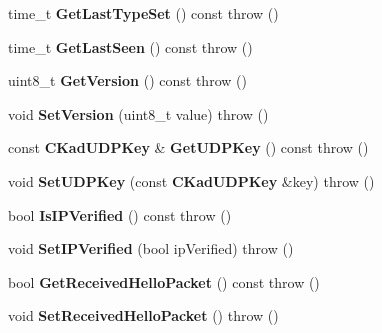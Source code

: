 \begin{DoxyCompactItemize}
\item 
time\_\-t {\bfseries GetLastTypeSet} () const   throw ()\label{classKademlia_1_1CContact_ad72c2ff3532316a48a8282dc014da35b}

\item 
time\_\-t {\bfseries GetLastSeen} () const   throw ()\label{classKademlia_1_1CContact_ac2820b261b028fe3bcac134ed10b3dc4}

\item 
uint8\_\-t {\bfseries GetVersion} () const   throw ()\label{classKademlia_1_1CContact_a2cee1cef932e993fcc8ca567614c7479}

\item 
void {\bfseries SetVersion} (uint8\_\-t value)  throw ()\label{classKademlia_1_1CContact_ae6e4f2cde3d277c312c5fae5673da504}

\item 
const {\bf CKadUDPKey} \& {\bfseries GetUDPKey} () const   throw ()\label{classKademlia_1_1CContact_a1d6267e953a39c7d01ca94d14098a028}

\item 
void {\bfseries SetUDPKey} (const {\bf CKadUDPKey} \&key)  throw ()\label{classKademlia_1_1CContact_a691e8ee8a9016c31231913a59452094b}

\item 
bool {\bfseries IsIPVerified} () const   throw ()\label{classKademlia_1_1CContact_acef900553668e23708c4efa5774fcb6f}

\item 
void {\bfseries SetIPVerified} (bool ipVerified)  throw ()\label{classKademlia_1_1CContact_a19caef54b82936896429e36a11be4c68}

\item 
bool {\bfseries GetReceivedHelloPacket} () const   throw ()\label{classKademlia_1_1CContact_adfbee994ac28404bb164bc5145b2c5dd}

\item 
void {\bfseries SetReceivedHelloPacket} ()  throw ()\label{classKademlia_1_1CContact_a7227029157640a6e39a35b08327c9286}

\end{DoxyCompactItemize}
